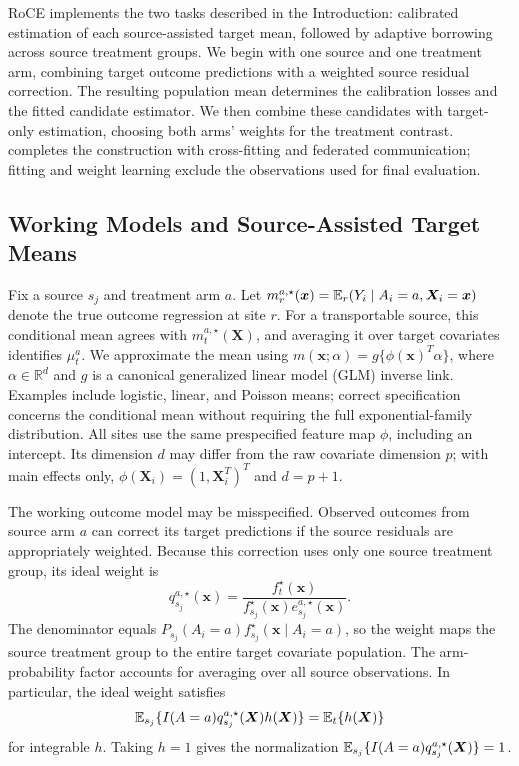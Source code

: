 \documentclass[12pt]{article}
\begin{document}
RoCE implements the two tasks described in the Introduction: calibrated estimation of each source-assisted target mean, followed by adaptive borrowing across source treatment groups. We begin with one source and one treatment arm, combining target outcome predictions with a weighted source residual correction. The resulting population mean determines the calibration losses and the fitted candidate estimator. We then combine these candidates with target-only estimation, choosing both arms' weights for the treatment contrast.  completes the construction with cross-fitting and federated communication; fitting and weight learning exclude the observations used for final evaluation.

\subsection{Working Models and Source-Assisted Target Means}\label{sec:nuisance}

Fix a source $s_j$ and treatment arm $a$. Let $m_r^{a,\star}(\boldsymbol x)=\mathbb{E}_r(Y_i\mid A_i=a,\boldsymbol X_i=\boldsymbol x)$ denote the true outcome regression at site $r$. For a transportable source, this conditional mean agrees with $m_t^{a,\star}(\boldsymbol X)$, and averaging it over target covariates identifies $\mu_t^a$. We approximate the mean using $m(\boldsymbol x;\alpha)=g\{\phi(\boldsymbol x)^T\alpha\}$, where $\alpha\in\mathbb R^d$ and $g$ is a canonical generalized linear model (GLM) inverse link. Examples include logistic, linear, and Poisson means; correct specification concerns the conditional mean without requiring the full exponential-family distribution. All sites use the same prespecified feature map $\phi$, including an intercept. Its dimension $d$ may differ from the raw covariate dimension $p$; with main effects only, $\phi(\boldsymbol X_i)=(1,\boldsymbol X_i^T)^T$ and $d=p+1$.

The working outcome model may be misspecified. Observed outcomes from source arm $a$ can correct its target predictions if the source residuals are appropriately weighted. Because this correction uses only one source treatment group, its ideal weight is
\[
q_{s_j}^{a,\star}(\boldsymbol x)=\frac{f_t^\star(\boldsymbol x)}{f_{s_j}^\star(\boldsymbol x)e_{s_j}^{a,\star}(\boldsymbol x)}.
\]
The denominator equals $P_{s_j}(A_i=a)f_{s_j}^\star(\boldsymbol x\mid A_i=a)$, so the weight maps the source treatment group to the entire target covariate population. The arm-probability factor accounts for averaging over all source observations. In particular, the ideal weight satisfies
\begin{equation}\label{eq:balancing_property}
\mathbb{E}_{s_j}\{I(A=a)q_{s_j}^{a,\star}(\boldsymbol X)h(\boldsymbol X)\}
=\mathbb{E}_t\{h(\boldsymbol X)\}
\end{equation}
for integrable $h$. Taking $h=1$ gives the normalization $\mathbb{E}_{s_j}\{I(A=a)q_{s_j}^{a,\star}(\boldsymbol X)\}=1$.
\end{document}

